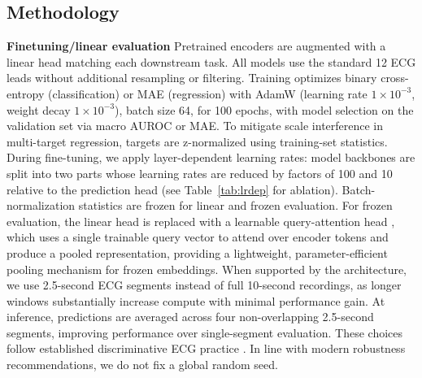 \documentclass{article}
\newcommand{\heading}[1]{\noindent\textbf{#1}}
\begin{document}
        \subsection{Methodology}
        \heading{Finetuning/linear evaluation} Pretrained encoders are augmented with a linear head matching each downstream task. All models use the standard 12 ECG leads without additional resampling or filtering. Training optimizes binary cross-entropy (classification) or MAE (regression) with AdamW (learning rate $1\times10^{-3}$, weight decay $1\times10^{-3}$), batch size 64, for 100 epochs, with model selection on the validation set via macro AUROC or MAE. To mitigate scale interference in multi-target regression, targets are z-normalized using training-set statistics. During fine-tuning, we apply layer-dependent learning rates: model backbones are split into two parts whose learning rates are reduced by factors of 100 and 10 relative to the prediction head (see Table~\ref{tab:lrdep} for ablation). Batch-normalization statistics are frozen for linear and frozen evaluation. For frozen evaluation, the linear head is replaced with a learnable query-attention head \citep{bardes2024vjepa}, which uses a single trainable query vector to attend over encoder tokens and produce a pooled representation, providing a lightweight, parameter-efficient pooling mechanism for frozen embeddings. When supported by the architecture, we use 2.5-second ECG segments instead of full 10-second recordings, as longer windows substantially increase compute with minimal performance gain. At inference, predictions are averaged across four non-overlapping 2.5-second segments, improving performance over single-segment evaluation. These choices follow established discriminative ECG practice \citep{mehari2023towards}. In line with modern robustness recommendations, we do not fix a global random seed. 
\end{document}

